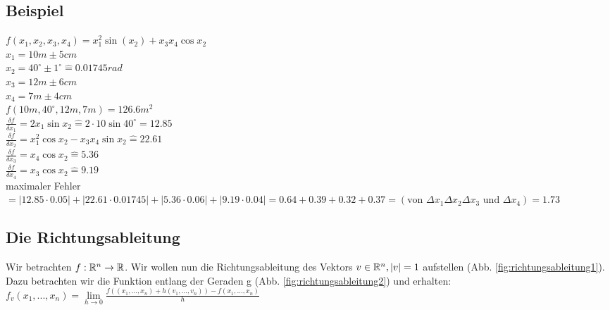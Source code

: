\subsection{Beispiel}
$ f(x_1,x_2,x_3,x_4) = x_1^2  \sin(x_2) + x_3 x_4  \cos x_2 $\\
$x_1 = 10m \pm 5cm$\\
$x_2=40^\circ \pm 1^\circ \widehat{=} 0.01745 rad$\\
$x_3=12m \pm 6cm$\\
$x_4=7m\pm 4cm$\\
$f(10m,40^\circ,12m,7m) = 126.6m^2$\\
$\frac{\delta f}{\delta x_1} = 2x_1 \sin x_2 \widehat{=} 2 \cdot 10 \sin 40^\circ = 12.85$\\
$\frac{\delta f}{\delta x_2} = x_1^2 \cos x_2 - x_3 x_4 \sin x_2 \widehat{=} 22.61$\\
$\frac{\delta f}{\delta x_3} = x_4 \cos x_2 \widehat{=} 5.36$\\
$\frac{\delta f}{\delta x_4} = x_3 \cos x_2 \widehat{=} 9.19$\\
maximaler Fehler $= |12.85 \cdot 0.05|+|22.61 \cdot 0.01745|+|5.36 \cdot 0.06|+|9.19 \cdot 0.04| = 0.64 + 0.39 + 0.32 + 0.37 = (\textrm{von } \Delta x_1 \Delta x_2 \Delta x_3 \textrm{ und }\Delta x_4) = 1.73 $

\subsection{Die Richtungsableitung}
Wir betrachten $ f: \mathbb{R}^n \rightarrow \mathbb{R}$. Wir wollen nun die Richtungsableitung des Vektors $ v \in \mathbb{R}^n, |v| = 1 $ aufstellen (Abb. \ref{fig:richtungsableitung1}). 
Dazu betrachten wir die Funktion entlang der Geraden g (Abb. \ref{fig:richtungsableitung2}) und erhalten: $ f_v(x_1,...,x_n) = \lim\limits_{h\rightarrow 0} \frac{f((x_1,...,x_n)+h(v_1,...,v_n)) - f(x_1,...,x_n)}{h} $



